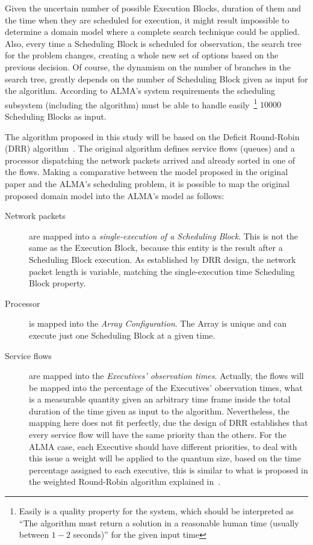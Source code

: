 Given the uncertain number of possible Execution Blocks, duration of them and the time when they are scheduled for execution, it might result impossible to determine a domain model where a complete search technique could be applied. Also, every time a Scheduling Block is scheduled for observation, the search tree for the problem changes, creating a whole new set of options based on the previous decision. Of course, the dynamism on the number of branches in the search tree, greatly depends on the number of Scheduling Block given as input for the algorithm. According to ALMA's system requirements the scheduling subsystem (including the algorithm) must be able to handle easily~\footnote{Easily is a quality property for the system, which should be interpreted as ``The algorithm must return a solution in a reasonable human time (usually between $1-2$ seconds)'' for the given input time} $10000$ Scheduling Blocks as input.

The algorithm proposed in this study will be based on the Deficit Round-Robin (DRR) algorithm~\cite{shreedhar96}. The original algorithm defines service flows (queues) and a processor dispatching the network packets arrived and already sorted in one of the flows. Making a comparative between the model proposed in the original paper and the ALMA's scheduling problem, it is possible to map the original proposed domain model into the ALMA's model as follows:

\begin{description}
\item[Network packets] are mapped into a \textit{single-execution of a Scheduling Block}. This is not the same as the Execution Block, because this entity is the result after a Scheduling Block execution. As established by DRR design, the network packet length is variable, matching the single-execution time Scheduling Block property.

\item[Processor] is mapped into the \textit{Array Configuration}. The Array is unique and can execute just one Scheduling Block at a given time.

\item[Service flows] are mapped into the \textit{Executives' observation times}. Actually, the flows will be mapped into the percentage of the Executives' observation times, what is a measurable quantity given an arbitrary time frame inside the total duration of the time given as input to the algorithm. Nevertheless, the mapping here does not fit perfectly, due the design of DRR establishes that every service flow will have the same priority than the others. For the ALMA case, each Executive should have different priorities, to deal with this issue a weight will be applied to the quantum size, based on the time percentage assigned to each executive, this is similar to what is proposed in the weighted Round-Robin algorithm explained in~\cite{katevenis91}.
\end{description}


